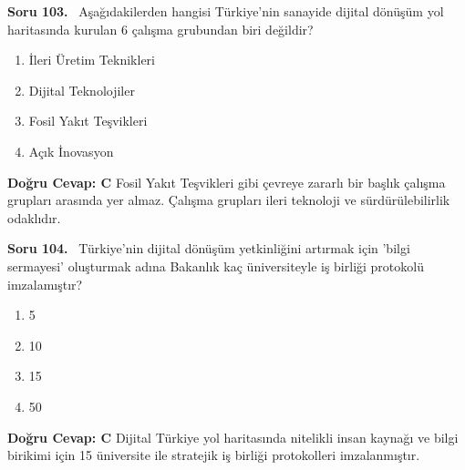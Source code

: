 \documentclass[11pt,a4paper,openany]{book}
\begin{document}
\needspace{5cm}
\vspace{8pt}
\noindent\textbf{\large\sffamily Soru 103.} \ Aşağıdakilerden hangisi Türkiye'nin sanayide dijital dönüşüm yol haritasında kurulan 6 çalışma grubundan biri değildir?
\begin{enumerate}[label=\Alph*), leftmargin=25pt, topsep=4pt, itemsep=2pt]
    \item İleri Üretim Teknikleri
    \item Dijital Teknolojiler
    \item Fosil Yakıt Teşvikleri
    \item Açık İnovasyon
\end{enumerate}
\vspace{4pt}
\begin{tcolorbox}[title=Cevap ve Açıklama, colback=gray!3!white, colframe=primarycolor!90!black, arc=2mm, fonttitle=\bfseries\sffamily, top=6pt, bottom=6pt]
    \textbf{Doğru Cevap: C}
    \vspace{2pt}
    Fosil Yakıt Teşvikleri gibi çevreye zararlı bir başlık çalışma grupları arasında yer almaz. Çalışma grupları ileri teknoloji ve sürdürülebilirlik odaklıdır.
\end{tcolorbox}
\vspace{10pt}

\needspace{5cm}
\vspace{8pt}
\noindent\textbf{\large\sffamily Soru 104.} \ Türkiye'nin dijital dönüşüm yetkinliğini artırmak için 'bilgi sermayesi' oluşturmak adına Bakanlık kaç üniversiteyle iş birliği protokolü imzalamıştır?
\begin{enumerate}[label=\Alph*), leftmargin=25pt, topsep=4pt, itemsep=2pt]
    \item 5
    \item 10
    \item 15
    \item 50
\end{enumerate}
\vspace{4pt}
\begin{tcolorbox}[title=Cevap ve Açıklama, colback=gray!3!white, colframe=primarycolor!90!black, arc=2mm, fonttitle=\bfseries\sffamily, top=6pt, bottom=6pt]
    \textbf{Doğru Cevap: C}
    \vspace{2pt}
    Dijital Türkiye yol haritasında nitelikli insan kaynağı ve bilgi birikimi için 15 üniversite ile stratejik iş birliği protokolleri imzalanmıştır.
\end{tcolorbox}
\vspace{10pt}
\end{document}
